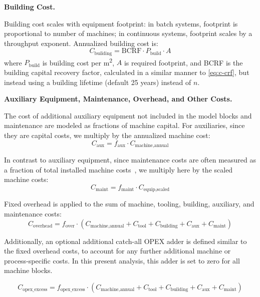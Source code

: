 \medskip
\noindent\textbf{Building Cost.}\quad

Building cost scales with equipment footprint: in batch systems, footprint is proportional to number of machines; in continuous systems, footprint scales by a throughput exponent. Annualized building cost is:
\begin{equation}
    C_{\text{building}} = \text{BCRF} \cdot P_{\text{build}} \cdot A
\end{equation}
where $P_{\text{build}}$ is building cost per m\textsuperscript{2}, $A$ is required footprint, and BCRF is the building capital recovery factor, calculated in a similar manner to \ref{eq:c-crf}, but instead using a building lifetime (default 25 years) instead of $n$.

\medskip
\noindent\textbf{Auxiliary Equipment, Maintenance, Overhead, and Other Costs.}\quad

The cost of additional auxiliary equipment not included in the model blocks and maintenance are modeled as fractions of machine capital. For auxiliaries, since they are capital costs, we multiply by the annualized machine cost:
\begin{equation}
    C_{\text{aux}} = f_{\text{aux}} \cdot C_{\text{machine,annual}}
\end{equation}

In contrast to auxiliary equipment, since maintenance costs are often measured as a fraction of total installed machine costs~\cite{petersPlantDesignEconomics1991, ausimmMonograph27Cost}, we multiply here by the scaled machine costs:
\begin{equation}
    C_{\text{maint}} = f_{\text{maint}} \cdot C_{\text{equip,scaled}}
\end{equation}

Fixed overhead is applied to the sum of machine, tooling, building, auxiliary, and maintenance costs:
\begin{equation}
    C_{\text{overhead}} = f_{\text{over}} \cdot 
    (C_{\text{machine,annual}} + C_{\text{tool}} + C_{\text{building}} + C_{\text{aux}} + 
    C_{\text{maint}})
\end{equation}

Additionally, an optional additional catch-all OPEX adder is defined similar to the fixed overhead costs, to account for any further additional machine or process-specific costs. In this present analysis, this adder is set to zero for all machine blocks. 

\begin{equation}
    C_{\text{opex\_excess}} = f_{\text{opex\_excess}} \cdot 
    (C_{\text{machine,annual}} + C_{\text{tool}} + C_{\text{building}} + C_{\text{aux}} + 
    C_{\text{maint}})
\end{equation}

